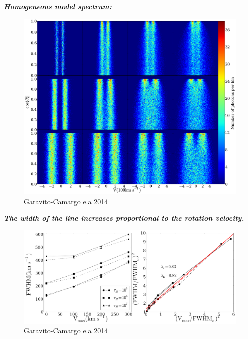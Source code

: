 \documentclass{beamer}
\begin{document}
\begin{frame}{\textbf{\textit{Homogeneous model spectrum:}}}
\begin{figure}
\includegraphics[scale=0.18]{Figures/f3.png}
\caption*{Garavito-Camargo e.a 2014}
\end{figure}
\end{frame}



\begin{frame}{\textit{\textbf{The width of the line increases proportional to the rotation velocity.}}}
\begin{figure}
\includegraphics[scale=0.26]{Figures/f7.png}
\caption*{Garavito-Camargo e.a 2014}
\end{figure}
\end{frame}
\end{document}
